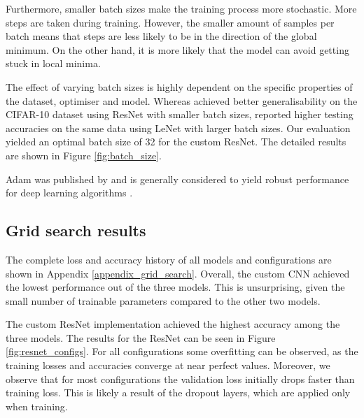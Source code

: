 \documentclass{l4proj}
\begin{document}
Furthermore, smaller batch sizes make the training process more stochastic. More steps are taken during training. However, the smaller amount of samples per batch means that steps are less likely to be in the direction of the global minimum. On the other hand, it is more likely that the model can avoid getting stuck in local minima.

The effect of varying batch sizes is highly dependent on the specific properties of the dataset, optimiser and model. Whereas \citet{masters_revisiting_2018} achieved better generalisability on the CIFAR-10 dataset \citep{krizhevsky_learning_2009} using ResNet with smaller batch sizes, \citet{radiuk_impact_2017} reported higher testing accuracies on the same data using LeNet \citep{lecun_gradient-based_1998} with larger batch sizes. Our evaluation yielded an optimal batch size of 32 for the custom ResNet. The detailed results are shown in Figure \ref{fig:batch_size}.

Adam was published by \citet{kingma_adam_2014} and is generally considered to yield robust performance for deep learning algorithms \citep{alom_history_2018}.

\subsection{Grid search results}

The complete loss and accuracy history of all models and configurations are shown in Appendix \ref{appendix_grid_search}. Overall, the custom CNN achieved the lowest performance out of the three models. This is unsurprising, given the small number of trainable parameters compared to the other two models.

The custom ResNet implementation achieved the highest accuracy among the three models. The results for the ResNet can be seen in Figure \ref{fig:resnet_configs}. For all configurations some overfitting can be observed, as the training losses and accuracies converge at near perfect values. Moreover, we observe that for most configurations the validation loss initially drops faster than training loss. This is likely a result of the dropout layers, which are applied only when training.
\end{document}
